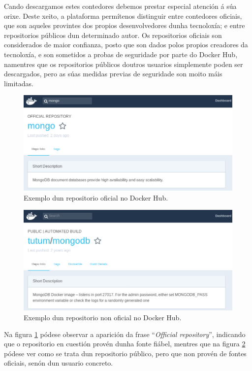Cando descargamos estes contedores debemos prestar especial atención á súa orixe. Deste xeito, a plataforma permítenos distinguir entre contedores oficiais, que son aqueles provintes dos propios desenvolvedores dunha tecnoloxía; e entre repositorios públicos dun determinado autor. Os repositorios oficiais son considerados de maior confianza, posto que son dados polos propios creadores da tecnoloxía, e son sometidos a probas de seguridade por parte do Docker Hub, namentres que os repositorios públicos doutros usuarios simplemente poden ser descargados, pero as súas medidas previas de seguridade son moito máis limitadas.\\

\begin{figure}
\centerline{\includegraphics[width=15cm]{figuras/dockerOficial}}
\caption{Exemplo dun repositorio oficial no Docker Hub.}
\label{dockerOficial}
\end{figure}

\begin{figure}
\centerline{\includegraphics[width=15cm]{figuras/mongoNonOficial.png}}
\caption{Exemplo dun repositorio non oficial no Docker Hub.}
\label{mongoNonOficial}
\end{figure}

Na figura \ref{dockerOficial} pódese observar a aparición da frase ``\textit{Official repository}'', indicando que o repositorio en cuestión provén dunha fonte fiábel, mentres que na figura \ref{mongoNonOficial} pódese ver como se trata dun repositorio público, pero que non provén de fontes oficiais, senón dun usuario concreto.

